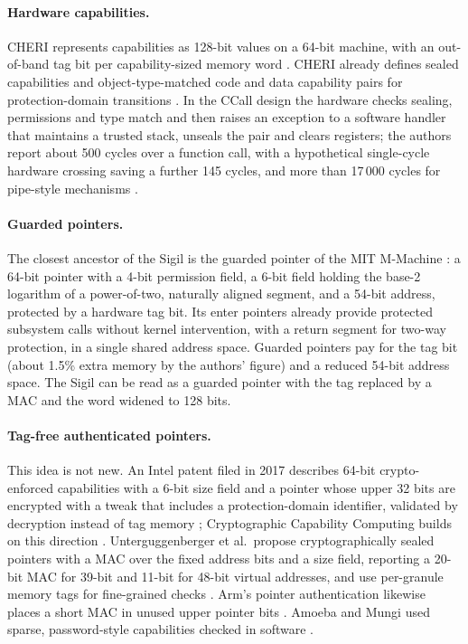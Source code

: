 \documentclass[10pt,a4paper]{article}
\begin{document}
\paragraph{Hardware capabilities.} CHERI represents capabilities as 128-bit values on a 64-bit machine, with an out-of-band tag bit per capability-sized memory word \citep{cheri,cheriisa}. CHERI already defines sealed capabilities and object-type-matched code and data capability pairs for protection-domain transitions \citep{cheriisa}. In the CCall design the hardware checks sealing, permissions and type match and then raises an exception to a software handler that maintains a trusted stack, unseals the pair and clears registers; the authors report about 500 cycles over a function call, with a hypothetical single-cycle hardware crossing saving a further 145 cycles, and more than 17\,000 cycles for pipe-style mechanisms \citep{cheridomain}.
\paragraph{Guarded pointers.} The closest ancestor of the Sigil is the guarded pointer of the MIT M-Machine \citep{guarded}: a 64-bit pointer with a 4-bit permission field, a 6-bit field holding the base-2 logarithm of a power-of-two, naturally aligned segment, and a 54-bit address, protected by a hardware tag bit. Its enter pointers already provide protected subsystem calls without kernel intervention, with a return segment for two-way protection, in a single shared address space. Guarded pointers pay for the tag bit (about 1.5\% extra memory by the authors' figure) and a reduced 54-bit address space. The Sigil can be read as a guarded pointer with the tag replaced by a MAC and the word widened to 128 bits.
\paragraph{Tag-free authenticated pointers.} This idea is not new. An Intel patent filed in 2017 describes 64-bit crypto-enforced capabilities with a 6-bit size field and a pointer whose upper 32 bits are encrypted with a tweak that includes a protection-domain identifier, validated by decryption instead of tag memory \citep{intelpat}; Cryptographic Capability Computing builds on this direction \citep{cthree}. Unterguggenberger et al.\ propose cryptographically sealed pointers with a MAC over the fixed address bits and a size field, reporting a 20-bit MAC for 39-bit and 11-bit for 48-bit virtual addresses, and use per-granule memory tags for fine-grained checks \citep{sealedptr}. Arm's pointer authentication likewise places a short MAC in unused upper pointer bits \citep{armpac}. Amoeba and Mungi used sparse, password-style capabilities checked in software \citep{amoeba,mungi}.
\end{document}
